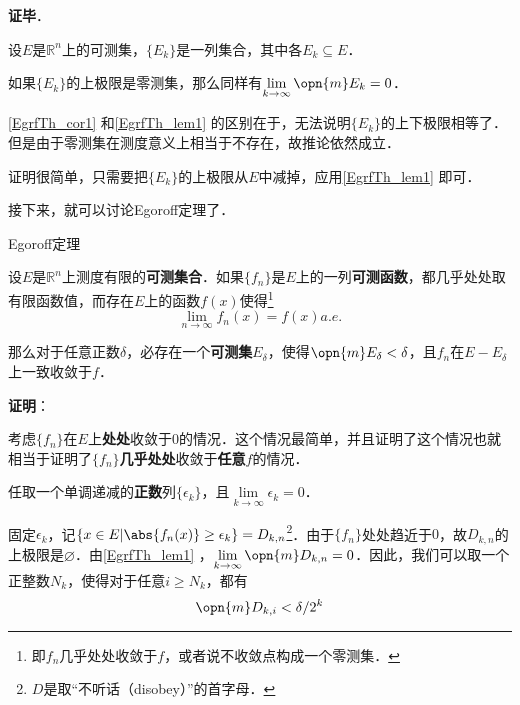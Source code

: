 \textbf{证毕}．

\begin{corollary}{}\label{EgrfTh_cor1}
设$E$是$\mathbb{R}^n$上的可测集，$\{E_k\}$是一列集合，其中各$E_k\subseteq E$．

如果$\{E_k\}$的上极限是零测集，那么同样有$\lim\limits_{k\to\infty}\opn{m}E_k=0$．
\end{corollary}

\autoref{EgrfTh_cor1} 和\autoref{EgrfTh_lem1} 的区别在于，无法说明$\{E_k\}$的上下极限相等了．但是由于零测集在测度意义上相当于不存在，故推论依然成立．

证明很简单，只需要把$\{E_k\}$的上极限从$E$中减掉，应用\autoref{EgrfTh_lem1} 即可．





接下来，就可以讨论Egoroff定理了．


\begin{theorem}{Egoroff定理}\label{EgrfTh_the1}

设$E$是$\mathbb{R}^n$上测度有限的\textbf{可测集合}．如果$\{f_n\}$是$E$上的一列\textbf{可测函数}，都几乎处处取有限函数值，而存在$E$上的函数$f(x)$使得\footnote{即$f_n$几乎处处收敛于$f$，或者说不收敛点构成一个零测集．}\begin{equation}
\lim\limits_{n\to\infty}f_n(x)=f(x)a. e. 
\end{equation}

那么对于任意正数$\delta$，必存在一个\textbf{可测集}$E_\delta$，使得$\opn{m}E_\delta<\delta$，且$f_n$在$E-E_\delta$上一致收敛于$f$．

\end{theorem}

\textbf{证明}：

考虑$\{f_n\}$在$E$上\textbf{处处}收敛于$0$的情况．这个情况最简单，并且证明了这个情况也就相当于证明了$\{f_n\}$\textbf{几乎处处}收敛于\textbf{任意}$f$的情况．



任取一个单调递减的\textbf{正数}列$\{\epsilon_k\}$，且$\lim\limits_{k\to\infty}\epsilon_k=0$．

固定$\epsilon_k$，记$\{x\in E|\abs{f_n(x)}\geq\epsilon_k\}=D_{k, n}$\footnote{$D$是取“不听话（disobey）”的首字母．}．由于$\{f_n\}$处处趋近于$0$，故$D_{k, n}$的上极限是$\varnothing$．由\autoref{EgrfTh_lem1} ，$\lim\limits_{k\to\infty}\opn{m}D_{k, n}=0$．因此，我们可以取一个正整数$N_k$，使得对于任意$i\geq N_k$，都有
\begin{equation}\label{EgrfTh_eq2}
\opn{m}D_{k, i}<\delta/2^k
\end{equation}

